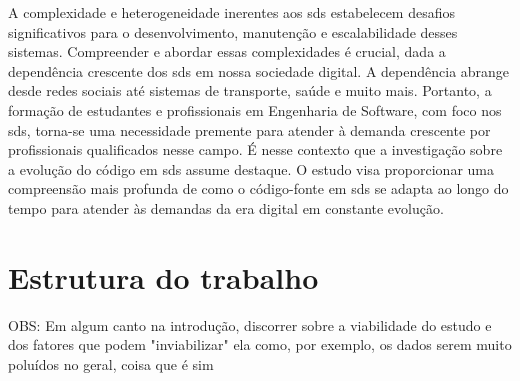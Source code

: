 A complexidade e heterogeneidade inerentes aos \gls{sds} estabelecem desafios significativos para o desenvolvimento, manutenção e escalabilidade desses sistemas. Compreender e abordar essas complexidades é crucial, dada a dependência crescente dos \gls{sds} em nossa sociedade digital. A dependência abrange desde redes sociais até sistemas de transporte, saúde e muito mais. Portanto, a formação de estudantes e profissionais em Engenharia de Software, com foco nos \gls{sds}, torna-se uma necessidade premente para atender à demanda crescente por profissionais qualificados nesse campo.
É nesse contexto que a investigação sobre a evolução do código em \gls{sds} assume destaque. O estudo visa proporcionar uma compreensão mais profunda de como o código-fonte em \gls{sds} se adapta ao longo do tempo para atender às demandas da era digital em constante evolução.

\section{Estrutura do trabalho}\label{sec:estruturaTrabalho}

OBS: Em algum canto na introdução, discorrer sobre a viabilidade do estudo e dos fatores que podem "inviabilizar" ela como, por exemplo, os dados serem muito poluídos no geral, coisa que é sim
